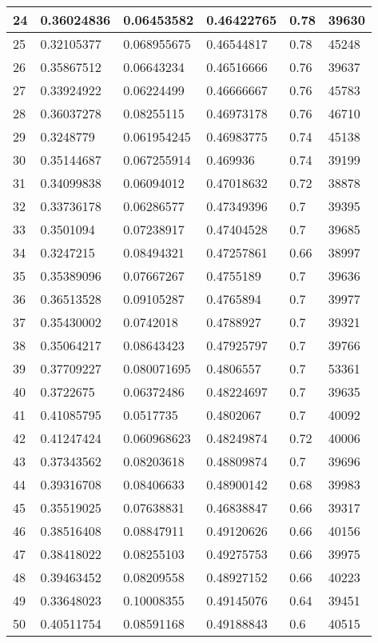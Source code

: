 \begin{longtable}{|l|l|l|l|l|l|}
24 & 0.36024836 & 0.06453582 & 0.46422765 & 0.78 & 39630 \\ \hline 
25 & 0.32105377 & 0.068955675 & 0.46544817 & 0.78 & 45248 \\ \hline 
26 & 0.35867512 & 0.06643234 & 0.46516666 & 0.76 & 39637 \\ \hline 
27 & 0.33924922 & 0.06224499 & 0.46666667 & 0.76 & 45783 \\ \hline 
28 & 0.36037278 & 0.08255115 & 0.46973178 & 0.76 & 46710 \\ \hline 
29 & 0.3248779 & 0.061954245 & 0.46983775 & 0.74 & 45138 \\ \hline 
30 & 0.35144687 & 0.067255914 & 0.469936 & 0.74 & 39199 \\ \hline 
31 & 0.34099838 & 0.06094012 & 0.47018632 & 0.72 & 38878 \\ \hline 
32 & 0.33736178 & 0.06286577 & 0.47349396 & 0.7 & 39395 \\ \hline 
33 & 0.3501094 & 0.07238917 & 0.47404528 & 0.7 & 39685 \\ \hline 
34 & 0.3247215 & 0.08494321 & 0.47257861 & 0.66 & 38997 \\ \hline 
35 & 0.35389096 & 0.07667267 & 0.4755189 & 0.7 & 39636 \\ \hline 
36 & 0.36513528 & 0.09105287 & 0.4765894 & 0.7 & 39977 \\ \hline 
37 & 0.35430002 & 0.0742018 & 0.4788927 & 0.7 & 39321 \\ \hline 
38 & 0.35064217 & 0.08643423 & 0.47925797 & 0.7 & 39766 \\ \hline 
39 & 0.37709227 & 0.080071695 & 0.4806557 & 0.7 & 53361 \\ \hline 
40 & 0.3722675 & 0.06372486 & 0.48224697 & 0.7 & 39635 \\ \hline 
41 & 0.41085795 & 0.0517735 & 0.4802067 & 0.7 & 40092 \\ \hline 
42 & 0.41247424 & 0.060968623 & 0.48249874 & 0.72 & 40006 \\ \hline 
43 & 0.37343562 & 0.08203618 & 0.48809874 & 0.7 & 39696 \\ \hline 
44 & 0.39316708 & 0.08406633 & 0.48900142 & 0.68 & 39983 \\ \hline 
45 & 0.35519025 & 0.07638831 & 0.46838847 & 0.66 & 39317 \\ \hline 
46 & 0.38516408 & 0.08847911 & 0.49120626 & 0.66 & 40156 \\ \hline 
47 & 0.38418022 & 0.08255103 & 0.49275753 & 0.66 & 39975 \\ \hline 
48 & 0.39463452 & 0.08209558 & 0.48927152 & 0.66 & 40223 \\ \hline 
49 & 0.33648023 & 0.10008355 & 0.49145076 & 0.64 & 39451 \\ \hline 
50 & 0.40511754 & 0.08591168 & 0.49188843 & 0.6 & 40515 \\ \hline 
\end{longtable}